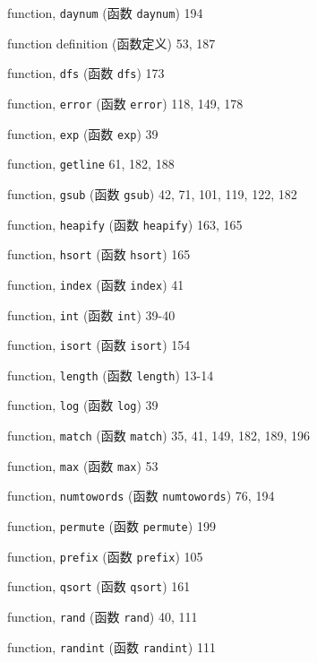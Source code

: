 \begin{multicols}{2}
\hangindent=2pc  function, \verb'daynum' (函数 \verb'daynum') 194

\hangindent=2pc  function definition (函数定义) 53, 187

\hangindent=2pc  function, \verb'dfs' (函数 \verb'dfs') 173

\hangindent=2pc  function, \verb'error' (函数 \verb'error')
118, 149, 178

\hangindent=2pc  function, \verb'exp' (函数 \verb'exp') 39

\hangindent=2pc  function, \verb'getline' 61, 182, 188

\hangindent=2pc  function, \verb'gsub' (函数 \verb'gsub')
42, 71, 101, 119, 122, 182

\hangindent=2pc  function, \verb'heapify' (函数 \verb'heapify')
163, 165

\hangindent=2pc  function, \verb'hsort' (函数 \verb'hsort') 165

\hangindent=2pc  function, \verb'index' (函数 \verb'index') 41

\hangindent=2pc  function, \verb'int' (函数 \verb'int') 39-40

\hangindent=2pc  function, \verb'isort' (函数 \verb'isort') 154

\hangindent=2pc  function, \verb'length' (函数 \verb'length') 13-14

\hangindent=2pc  function, \verb'log' (函数 \verb'log') 39

\hangindent=2pc  function, \verb'match' (函数 \verb'match')
35, 41, 149, 182, 189, 196

\hangindent=2pc  function, \verb'max' (函数 \verb'max') 53

\hangindent=2pc  function, \verb'numtowords' (函数
\verb'numtowords') 76, 194

\hangindent=2pc  function, \verb'permute' (函数 \verb'permute') 199

\hangindent=2pc  function, \verb'prefix' (函数 \verb'prefix') 105

\hangindent=2pc  function, \verb'qsort' (函数 \verb'qsort') 161

\hangindent=2pc  function, \verb'rand' (函数 \verb'rand') 40, 111

\hangindent=2pc  function, \verb'randint' (函数 \verb'randint') 111


\end{multicols}
